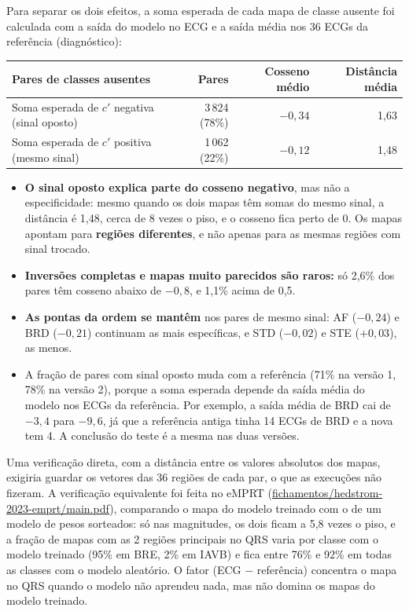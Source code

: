 \documentclass[11pt,a4paper]{article}
\begin{document}
Para separar os dois efeitos, a soma esperada de cada mapa de classe ausente foi calculada com a saída do modelo no ECG e a saída média nos 36 ECGs da referência (diagnóstico):
\begin{center}\small
\begin{tabular}{lrrr}
\toprule
\textbf{Pares de classes ausentes} & \textbf{Pares} & \textbf{Cosseno médio} & \textbf{Distância média} \\
\midrule
Soma esperada de $c'$ negativa (sinal oposto) & 3\,824 (78\%) & $-0{,}34$ & 1,63 \\
Soma esperada de $c'$ positiva (mesmo sinal) & 1\,062 (22\%) & $-0{,}12$ & 1,48 \\
\bottomrule
\end{tabular}
\end{center}
\begin{itemize}
\item \textbf{O sinal oposto explica parte do cosseno negativo}, mas não a especificidade: mesmo quando os dois mapas têm somas do mesmo sinal, a distância é 1,48, cerca de 8 vezes o piso, e o cosseno fica perto de 0. Os mapas apontam para \textbf{regiões diferentes}, e não apenas para as mesmas regiões com sinal trocado.
\item \textbf{Inversões completas e mapas muito parecidos são raros:} só 2,6\% dos pares têm cosseno abaixo de $-0{,}8$, e 1,1\% acima de 0,5.
\item \textbf{As pontas da ordem se mantêm} nos pares de mesmo sinal: AF ($-0{,}24$) e BRD ($-0{,}21$) continuam as mais específicas, e STD ($-0{,}02$) e STE ($+0{,}03$), as menos.
\item A fração de pares com sinal oposto muda com a referência (71\% na versão 1, 78\% na versão 2), porque a soma esperada depende da saída média do modelo nos ECGs da referência. Por exemplo, a saída média de BRD cai de $-3{,}4$ para $-9{,}6$, já que a referência antiga tinha 14 ECGs de BRD e a nova tem 4. A conclusão do teste é a mesma nas duas versões.
\end{itemize}
Uma verificação direta, com a distância entre os valores absolutos dos mapas, exigiria guardar os vetores das 36 regiões de cada par, o que as execuções não fizeram. A verificação equivalente foi feita no eMPRT (\url{fichamentos/hedstrom-2023-emprt/main.pdf}), comparando o mapa do modelo treinado com o de um modelo de pesos sorteados: só nas magnitudes, os dois ficam a 5,8 vezes o piso, e a fração de mapas com as 2 regiões principais no QRS varia por classe com o modelo treinado (95\% em BRE, 2\% em IAVB) e fica entre 76\% e 92\% em todas as classes com o modelo aleatório. O fator (ECG $-$ referência) concentra o mapa no QRS quando o modelo não aprendeu nada, mas não domina os mapas do modelo treinado.
\end{document}
